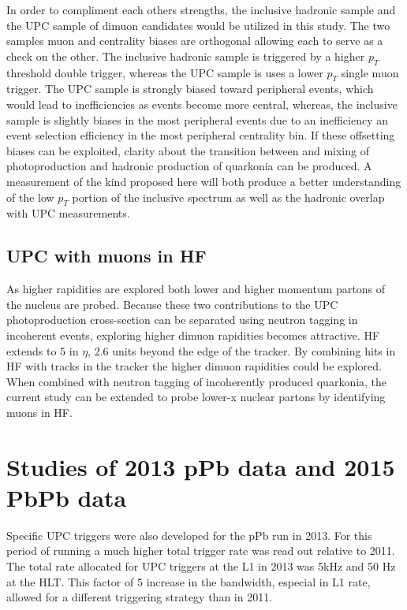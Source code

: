       In order to compliment each others strengths, the inclusive hadronic sample 
				and the UPC sample of dimuon candidates would be utilized in this study.
      The two samples muon and centrality biases are orthogonal allowing each to 
				serve as a check on the other. 
      The inclusive hadronic sample is triggered by a higher $p_{T}$ threshold 
				double trigger, whereas the UPC sample is uses a lower $p_{T}$ single 
				muon trigger.
      The UPC sample is strongly biased toward peripheral events, which would 
				lead to inefficiencies as events become more central, whereas, the 
				inclusive sample is slightly biases in the most peripheral events due to
				an inefficiency an event selection efficiency in the most peripheral 
				centrality bin.
      If these offsetting biases can be exploited, clarity about the transition 
				between and mixing of photoproduction and hadronic production of 
				quarkonia can be produced. 
      A measurement of the kind proposed here will both produce a better 
				understanding of the low $p_{T}$ portion of the inclusive spectrum as 
				well as the hadronic overlap with UPC measurements.

    \subsection{UPC with muons in HF}
      As higher rapidities are explored both lower and higher momentum partons
        of the nucleus are probed. 
      Because these two contributions to the UPC photoproduction cross-section 
        can be separated using neutron tagging in incoherent events, exploring
				higher dimuon rapidities becomes attractive.
      HF extends to 5 in $\eta$, 2.6 units beyond the edge of the tracker.
      By combining hits in HF with tracks in the tracker the higher dimuon 
        rapidities could be explored. 
      When combined with neutron tagging of incoherently produced quarkonia,
        the current study can be extended to probe lower-x nuclear partons 
			  by identifying muons in HF. 

  \section{Studies of 2013 pPb data and 2015 PbPb data}
	  Specific UPC triggers were also developed for the pPb run in 2013. 
		For this period of running a much higher total trigger rate was read out 
		  relative to 2011.
		The total rate allocated for UPC triggers at the L1 in 2013 was 5kHz and 
		  50 Hz at the HLT.
		This factor of 5 increase in the bandwidth, especial in L1 rate, allowed for
		  a different triggering strategy than in 2011. 

